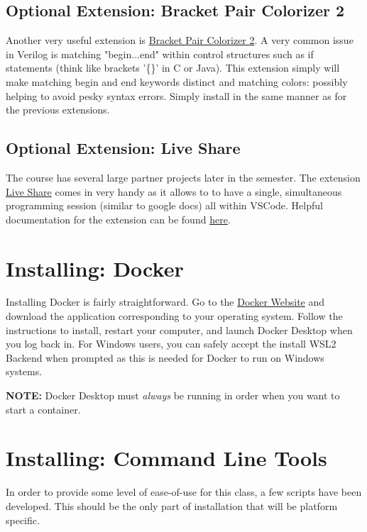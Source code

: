 \documentclass[11pt, letterpaper, titlepage, oneside]{memoir}
\begin{document}
		\subsection*{Optional Extension: Bracket Pair Colorizer 2}
		    Another very useful extension is \href{https://marketplace.visualstudio.com/items?itemName=CoenraadS.bracket-pair-colorizer-2}{Bracket Pair Colorizer 2}. A very common issue in Verilog is matching "begin...end" within control structures such as if statements (think like brackets '\{\}' in C or Java). This extension simply will make matching begin and end keywords distinct and matching colors: possibly helping to avoid pesky syntax errors. Simply install in the same manner as for the previous extensions.
	    
	    \subsection*{Optional Extension: Live Share}
	        The course has several large partner projects later in the semester. The extension \href{https://marketplace.visualstudio.com/items?itemName=MS-vsliveshare.vsliveshare}{Live Share} comes in very handy as it allows to to have a single, simultaneous programming session (similar to google docs) all within VSCode. Helpful documentation for the extension can be found \href{https://docs.microsoft.com/en-us/visualstudio/liveshare/use/vscode}{here}.
	        
    \section*{Installing: Docker}
        Installing Docker is fairly straightforward. Go to the \href{https://docs.docker.com/get-docker/}{Docker Website} and download the application corresponding to your operating system. Follow the instructions to install, restart your computer, and launch Docker Desktop when you log back in. For Windows users, you can safely accept the install WSL2 Backend when prompted as this is needed for Docker to run on Windows systems.

        \textbf{NOTE:} Docker Desktop must \textit{always} be running in order when you want to start a container.
    
    \section*{Installing: Command Line Tools}
        In order to provide some level of ease-of-use for this class, a few scripts have been developed. This should be the only part of installation that will be platform specific.
\end{document}
